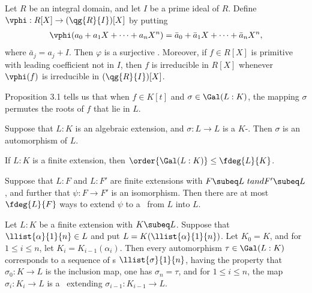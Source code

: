 \documentclass[a4paper]{article}
\begin{document}
\begin{ttheorem}
  Let \( R \) be an integral domain, and let \( I \) be a prime ideal of \( R \).
  Define \( \vphi:R[X]\to (\qg{R}{I})[X] \) by putting \begin{align*}
    \vphi(a_0+a_1X+\cdots+a_nX^n) =\bar a_0+\bar a_1X+\cdots+\bar a_nX^n,
  \end{align*}
  where \( \bar a_j = a_j + I \).
  Then \( \varphi \) is a surjective \homo.
  Moreover, if \( f\in R[X] \) is primitive with leading coefficient not in \( I \), then \( f \) is irreducible in \( R[X] \) whenever \( \vphi(f) \) is irreducible in \( (\qg{R}{I})[X] \).
\end{ttheorem}

\quad Proposition 3.1 tells us that when \( f\in K[t] \) and \( \sigma\in \Gal(L:K) \), the mapping \( \sigma \) permutes the roots of \( f \) that lie in \( L \).

\begin{ttheorem}
  Suppose that \( L:K \) is an algebraic extension, and \( \sigma:L\to L \) is a \( K \)-\homo.
  Then \( \sigma \) is an automorphism of \( L \).
\end{ttheorem}

\begin{ttheorem}
  If \( L:K \) is a finite extension, then \( \order{\Gal(L:K)}\leq \fdeg{L}{K} \).
\end{ttheorem}

\begin{tcorollary}
  Suppose that \( L:F \) and \( L:F' \) are finite extensions with \( F\subeq L\ tand F'\subeq L \), and further that \( \psi:F\to F' \) is an isomorphism.
  Then there are at most \( \fdeg{L}{F} \) ways to extend \( \psi \) to a \homo~from \( L \) into \( L \).
\end{tcorollary}

\begin{tcorollary}
  Let \( L:K \) be a finite extension with \( K\subeq L \).
  Suppose that \( \llist{\alpha}{1}{n}\in L \) and put \( L=K(\llist{\alpha}{1}{n}) \).
  Let \( K_0 = K \), and for \( 1\leq i\leq n \), let \( K_i = K_{i-1}(\alpha_i) \).
  Then every automorphism \( \tau \in \Gal(L:K) \) corresponds to a sequence of \homo s \( \llist{\sigma}{1}{n} \), having the property that \( \sigma_0:K\to L \) is the inclusion map, one has \( \sigma_n=\tau \), and for \( 1\leq i\leq n \), the map \( \sigma_i : K_i\to L \) is a \homo~extending \( \sigma_{i-1}:K_{i-1}\to L \).
\end{tcorollary}
\end{document}
